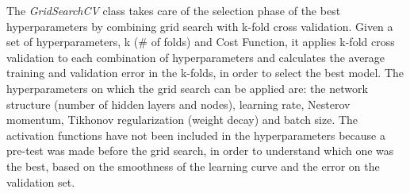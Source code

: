 \vspace{3mm}

The \textit{GridSearchCV} class takes care of the selection phase of the best hyperparameters by combining grid search with k-fold cross validation. Given a set of hyperparameters, k (\# of folds) and Cost Function, it applies k-fold cross validation to each combination of hyperparameters and calculates the average training and validation error in the k-folds, in order to select the best model. The hyperparameters on which the grid search can be applied are: the network structure (number of hidden layers and nodes), learning rate, Nesterov momentum, Tikhonov regularization (weight decay) and batch size. The activation functions have not been included in the hyperparameters because a pre-test was made before the grid search, in order to understand which one was the best, based on the smoothness of the learning curve and the error on the validation set.

